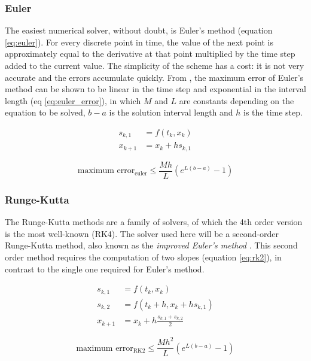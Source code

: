 \subsubsection{Euler}
The easiest numerical solver, without doubt, is Euler's method (equation \ref{eq:euler}). For every discrete point in time, the value of the next point is approximately equal to the derivative at that point multiplied by the time step added to the current value. The simplicity of the scheme has a cost: it is not very accurate and the errors accumulate quickly. From \cite{DE}, the maximum error of Euler's method can be shown to be linear in the time step and exponential in the interval length (eq \ref{eq:euler_error}), in which $M$ and $L$ are constants depending on the equation to be solved, $b-a$ is the solution interval length and $h$ is the time step.

\begin{align}
	\label{eq:euler}
	s_{k,1} &= f(t_{k},x_{k}) \\
	x_{k+1} &= x_{k} + h s_{k,1} \nonumber
\end{align}

\begin{equation}
\label{eq:euler_error}
\text{maximum error}_{\text{euler}} \leq \frac{M h}{L} (e^{L(b-a)} -1)
\end{equation}

\subsubsection{Runge-Kutta}
The Runge-Kutta methods are a family of solvers, of which the 4th order version is the most well-known (RK4). The solver used here will be a second-order Runge-Kutta method, also known as the \emph{improved Euler's method} \cite{DE}. This second order method requires the computation of two slopes (equation \ref{eq:rk2}), in contrast to the single one required for Euler's method.

\begin{align}
	\label{eq:rk2}
	s_{k,1} &= f(t_{k},x_{k}) \\
	s_{k,2} &= f(t_{k} + h,x_{k} + h s_{k,1}) \nonumber \\
	x_{k+1} &= x_{k} + h \frac{s_{k,1} + s_{k,2}}{2} \nonumber
\end{align}

\begin{equation}
\label{eq:rk2_error}
\text{maximum error}_{\text{RK2}} \leq \frac{M h^{2}}{L} (e^{L(b-a)} -1)
\end{equation}

